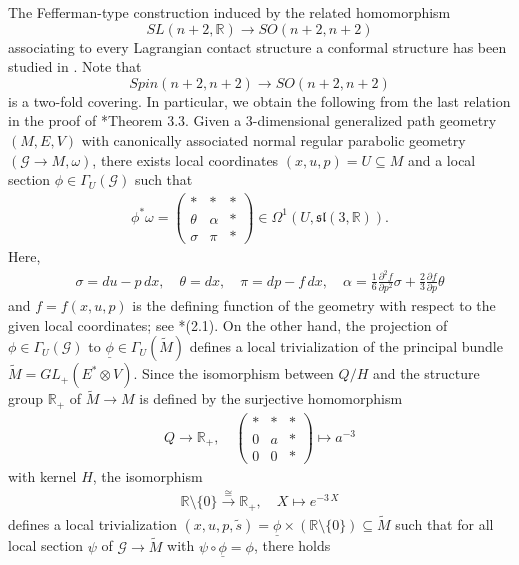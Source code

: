 \documentclass[11pt]{amsart}
\begin{document}
The Fefferman-type construction induced by the related homomorphism \[SL(n+2,\mathbb R)\to SO(n+2,n+2)\] associating to every Lagrangian contact structure a conformal structure has been studied in \cite{Ma+}. Note that \[Spin(n+2,n+2)\to SO(n+2,n+2)\] is a two-fold covering. In particular, we obtain the following from the last relation in the proof of \cite{Ma+}*{Theorem 3.3}. Given a $3$-dimensional generalized path geometry $(M,E,V)$ with canonically associated normal regular parabolic geometry $(\mathcal G\to M,\omega)$, there exists local coordinates $(x,u,p)=U\subseteq M$ and a local section $\phi\in\Gamma_U(\mathcal G)$ such that
\begin{align*}
\phi^*\omega=\left(\begin{array}{ccc}
		*&*&*\\
		\theta&\alpha&*\\
		\sigma&\pi&*
	\end{array}\right)\in\Omega^1(U,\mathfrak {sl}(3,\mathbb R)).
\end{align*}
Here,
\begin{align*}
    \sigma=du-p\,dx,\quad\theta=dx,\quad\pi=dp-f\,dx,\quad\alpha=\frac 1 6\frac{\partial^2f}{\partial p^2}\sigma+\frac 2 3\frac{\partial f}{\partial p}\theta
\end{align*}
and $f=f(x,u,p)$ is the defining function of the geometry with respect to the given local coordinates; see \cite{DMT}*{(2.1)}. On the other hand, the projection of $\phi\in\Gamma_U(\mathcal G)$ to $\underline\phi\in\Gamma_U(\tilde M)$ defines a local trivialization of the principal bundle $\tilde M=GL_+(E^*\otimes V)$. Since the isomorphism between $Q/H$ and the structure group $\mathbb R_+$ of $\tilde M\to M$ is defined by the surjective homomorphism
\begin{align*}
    Q\to\mathbb R_+,\quad\left(\begin{array}{ccc}
		*&*&*\\
		0&a&*\\
		0&0&*
	\end{array}\right)\mapsto a^{-3}
\end{align*}
with kernel $H$, the isomorphism
\begin{align*}
\mathbb R\setminus\{0\}\xrightarrow{\cong}\mathbb R_+,\quad X\mapsto e^{-3\,X}  
\end{align*}
defines a local trivialization $(x,u,p,\tilde s)=\underline\phi\times(\mathbb R\setminus\{0\})\subseteq\tilde M$ such that for all local section $\psi$ of $\mathcal G\to\tilde M$ with $\psi\circ\underline\phi=\phi$, there holds
\end{document}
